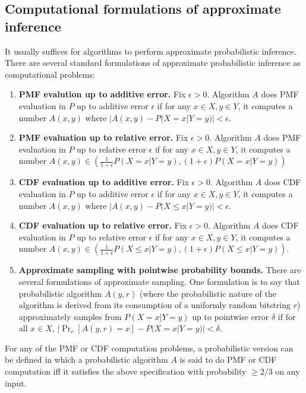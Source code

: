 \documentclass{article}
\theoremstyle{definition}
\theoremstyle{remark}
\begin{document}

\subsection{Computational formulations of approximate inference}
It usually suffices for algorithms to perform approximate probabilistic inference.
There are several standard formulations of approximate probabilistic inference as computational problems:
\begin{enumerate}
    \item \textbf{PMF evalution up to additive error.} Fix $\epsilon > 0$.  Algorithm $A$ does PMF evaluation in $P$ up to additive error $\epsilon$ if for any $x \in X, y \in Y$, it computes a number $A(x, y)$ where $|A(x, y) - P(X = x | Y = y)| < \epsilon$.
    \item \textbf{PMF evaluation up to relative error.} Fix $\epsilon > 0$.  Algorithm $A$ does PMF evaluation in $P$ up to relative error $\epsilon$ if for any $x \in X, y \in Y$, it computes a number $A(x, y) \in (\frac{1}{1 + \epsilon}P(X = x | Y = y), (1 + \epsilon)P(X = x | Y = y))$
    \item \textbf{CDF evaluation up to additive error.} Fix $\epsilon > 0$.  Algorithm $A$ does CDF evaluation in $P$ up to additive error $\epsilon$ if for any $x \in X, y \in Y$, it computes a number $A(x, y)$ where $|A(x, y) - P(X \leq x | Y = y)| < \epsilon$.
    \item \textbf{CDF evaluation up to relative error.} Fix $\epsilon > 0$.  Algorithm $A$ does CDF evaluation in $P$ up to relative error $\epsilon$ if for any $x \in X, y \in Y$, it computes a number $A(x, y) \in (\frac{1}{1 + \epsilon}P(X \leq x | Y = y), (1 + \epsilon)P(X \leq x | Y = y))$.
    \item \textbf{Approximate sampling with pointwise probability bounds.} There are several formulations of approximate sampling. One formulation is to say that probabilistic algorithm $A(y, r)$ (where the probabilistic nature of the algorithm is derived from its consumption of a uniformly random bitstring $r$) approximately samples from $P(X = x | Y = y)$ up to pointwise error $\delta$ if for all $x \in X$, $|\Pr_r[A(y, r) = x] - P(X = x | Y = y)| < \delta$.
\end{enumerate}
For any of the PMF or CDF computation problems, a probabilistic version can be defined in which a probabilistic algorithm $A$ is said to do PMF or CDF computation iff it satisfies the above specification with probability $\geq 2/3$ on any input.
\end{document}
